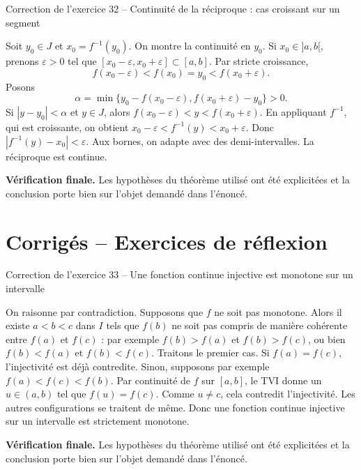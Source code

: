 \documentclass[11pt,a4paper]{article}
\begin{document}
\begin{corrbox}{Correction de l'exercice 32 -- Continuité de la réciproque : cas croissant sur un segment}

Soit $y_0\in J$ et $x_0=f^{-1}(y_0)$. On montre la continuité en $y_0$. Si $x_0\in]a,b[$, prenons $\varepsilon>0$ tel que $[x_0-\varepsilon,x_0+\varepsilon]\subset[a,b]$. Par stricte croissance,
\[
f(x_0-\varepsilon)<f(x_0)=y_0<f(x_0+\varepsilon).
\]
Posons
\[
\alpha=\min\{y_0-f(x_0-\varepsilon),f(x_0+\varepsilon)-y_0\}>0.
\]
Si $|y-y_0|<\alpha$ et $y\in J$, alors $f(x_0-\varepsilon)<y<f(x_0+\varepsilon)$. En appliquant $f^{-1}$, qui est croissante, on obtient $x_0-\varepsilon<f^{-1}(y)<x_0+\varepsilon$. Donc $|f^{-1}(y)-x_0|<\varepsilon$. Aux bornes, on adapte avec des demi-intervalles. La réciproque est continue.

\medskip
\textbf{Vérification finale.} Les hypothèses du théorème utilisé ont été explicitées et la conclusion porte bien sur l'objet demandé dans l'énoncé.
\end{corrbox}


\section{Corrigés -- Exercices de réflexion}
\begin{corrbox}{Correction de l'exercice 33 -- Une fonction continue injective est monotone sur un intervalle}

On raisonne par contradiction. Supposons que $f$ ne soit pas monotone. Alors il existe $a<b<c$ dans $I$ tels que $f(b)$ ne soit pas compris de manière cohérente entre $f(a)$ et $f(c)$ : par exemple $f(b)>f(a)$ et $f(b)>f(c)$, ou bien $f(b)<f(a)$ et $f(b)<f(c)$. Traitons le premier cas. Si $f(a)=f(c)$, l'injectivité est déjà contredite. Sinon, supposons par exemple $f(a)<f(c)<f(b)$. Par continuité de $f$ sur $[a,b]$, le TVI donne un $u\in(a,b)$ tel que $f(u)=f(c)$. Comme $u\neq c$, cela contredit l'injectivité. Les autres configurations se traitent de même. Donc une fonction continue injective sur un intervalle est strictement monotone.

\medskip
\textbf{Vérification finale.} Les hypothèses du théorème utilisé ont été explicitées et la conclusion porte bien sur l'objet demandé dans l'énoncé.
\end{corrbox}
\end{document}
